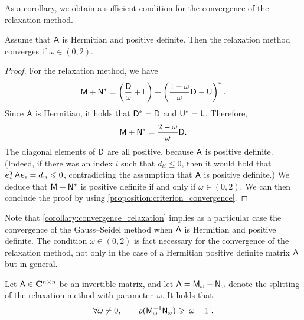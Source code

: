 As a corollary,
we obtain a sufficient condition for the convergence of the relaxation method.
\begin{corollary}
    \label{corollary:convergence_relaxation}
    Assume that $\mathsf A$ is Hermitian and positive definite.
    Then the relaxation method converges if $\omega \in (0, 2)$.
\end{corollary}
\begin{proof}
    For the relaxation method,
    we have
    \[
        \mathsf M + \mathsf N^*
        = \left( \frac{\mathsf D}{\omega} + \mathsf L \right) + \left(\frac{1 - \omega}{\omega} \mathsf D - \mathsf U \right)^*.
    \]
    Since $\mathsf A$ is Hermitian,
    it holds that $\mathsf D^* = \mathsf D$ and $\mathsf U^* = \mathsf L$.
    Therefore,
    \[
        \mathsf M + \mathsf N^*
        = \frac{2 - \omega}{\omega} \mathsf D.
    \]
    The diagonal elements of $\mathsf D$ are all positive,
    because $\mathsf A$ is positive definite.
    (Indeed, if there was an index $i$ such that $d_{ii} \leq 0$,
    then it would hold that $\mathbf{\boldsymbol{e}}_i^T \mathsf A \mathbf{\boldsymbol{e}}_i = d_{ii} \leqslant 0$,
    contradicting the assumption that $\mathsf A$ is positive definite.)
    We deduce that $\mathsf M + \mathsf N^*$ is positive definite if and only if $\omega \in (0, 2)$.
    We can then conclude the proof by using \cref{proposition:criterion_convergence}.
\end{proof}
Note that \cref{corollary:convergence_relaxation} implies as a particular case
the convergence of the Gauss--Seidel method when $\mathsf A$ is Hermitian and positive definite.
The condition $\omega \in (0, 2)$ is fact necessary for the convergence of the relaxation method,
not only in the case of a Hermitian positive definite matrix $\mathsf A$ but in general.
\begin{proposition}
    \label{proposition:necessary_sor}
    Let $\mathsf A \in \mathbf C^{n \times n}$ be an invertible matrix,
    and let $\mathsf A = \mathsf M_{\omega} - \mathsf N_{\omega}$ denote the splitting of the relaxation method with parameter~$\omega$.
    It holds that
    \[
        \forall \omega \neq 0, \qquad
        \rho(\mathsf M_{\omega}^{-1} \mathsf N_{\omega})
        \geqslant \lvert\omega - 1\rvert.
    \]
\end{proposition}
